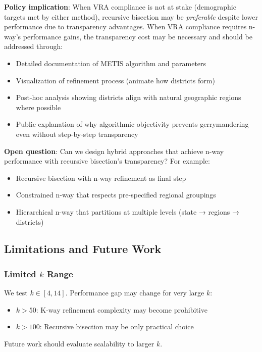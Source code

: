 \textbf{Policy implication}: When VRA compliance is not at stake (demographic targets met by either method), recursive bisection may be \textit{preferable} despite lower performance due to transparency advantages. When VRA compliance requires n-way's performance gains, the transparency cost may be necessary and should be addressed through:
\begin{itemize}
\item Detailed documentation of METIS algorithm and parameters
\item Visualization of refinement process (animate how districts form)
\item Post-hoc analysis showing districts align with natural geographic regions where possible
\item Public explanation of why algorithmic objectivity prevents gerrymandering even without step-by-step transparency
\end{itemize}

\textbf{Open question}: Can we design hybrid approaches that achieve n-way performance with recursive bisection's transparency? For example:
\begin{itemize}
\item Recursive bisection with n-way refinement as final step
\item Constrained n-way that respects pre-specified regional groupings
\item Hierarchical n-way that partitions at multiple levels (state → regions → districts)
\end{itemize}

\subsection{Limitations and Future Work}

\subsubsection{Limited $k$ Range}

We test $k \in [4, 14]$. Performance gap may change for very large $k$:
\begin{itemize}
\item \textbf{$k > 50$}: K-way refinement complexity may become prohibitive
\item \textbf{$k > 100$}: Recursive bisection may be only practical choice
\end{itemize}

Future work should evaluate scalability to larger $k$.


